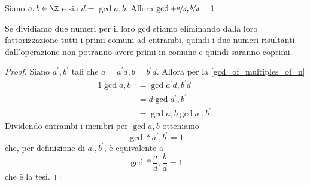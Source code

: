\begin{corollary} \label{gcd_diviso_gcd}
    Siano $a, b \in \Z$ e sia $d = \gcd{a, b}$. Allora $\gcd{\nicefrac{a}{d}, \nicefrac{b}{d}} = 1$.
\end{corollary}
\begin{intuition}
    Se dividiamo due numeri per il loro gcd stiamo eliminando dalla loro fattorizzazione tutti i primi comuni ad entrambi, quindi i due numeri risultanti dall'operazione non potranno avere primi in comune e quindi saranno coprimi.
\end{intuition}
\begin{proof}
    Siano $a^\prime, b^\prime$ tali che $a = a^\prime d, b = b^\prime d$. Allora per la \autoref{gcd_of_multiples_of_n}
    \begin{alignat*}{1}
        \gcd{a, b} &= \gcd{a^\prime d, b^\prime d} \\
                   &= d\gcd{a^\prime, b^\prime} \\
                   &= \gcd{a, b} \gcd{a^\prime, b^\prime}.
        \end{alignat*} 
    Dividendo entrambi i membri per $\gcd{a, b}$ otteniamo \[
        \gcd*{a^\prime, b^\prime} = 1 
    \]
    che, per definizione di $a^\prime, b^\prime$, è equivalente a \[
        \gcd*{\frac{a}{d}, \frac{b}{d}} = 1
    \]
    che è la tesi.
\end{proof}
